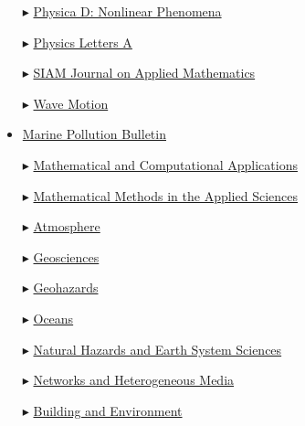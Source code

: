 \begin{itemize}
    \item[$\blacktriangleright$] \href{https://www.sciencedirect.com/journal/physica-d-nonlinear-phenomena/}{Physica D: Nonlinear Phenomena}
    
    \item[$\blacktriangleright$] \href{http://www.journals.elsevier.com/physics-letters-a/}{Physics Letters A}
    
    \item[$\blacktriangleright$] \href{http://www.siam.org/journals/siap.php}{SIAM Journal on Applied Mathematics}
  
    \item[$\blacktriangleright$] \href{http://www.elsevier.com/locate/wavemoti}%
    {Wave Motion}

    \item \href{https://www.sciencedirect.com/journal/marine-pollution-bulletin/}{Marine Pollution Bulletin}
    
    \item[$\blacktriangleright$] \href{https://www.mdpi.com/journal/mca}{Mathematical and Computational Applications}
    
    \item[$\blacktriangleright$] \href{https://onlinelibrary.wiley.com/journal/10991476/}{Mathematical Methods in the Applied Sciences}

    \item[$\blacktriangleright$] \href{https://www.mdpi.com/journal/atmosphere/}{Atmosphere}
    
    \item[$\blacktriangleright$] \href{https://www.mdpi.com/journal/geosciences/}{Geosciences}

    \item[$\blacktriangleright$] \href{https://www.mdpi.com/journal/geohazards/}{Geohazards}

    \item[$\blacktriangleright$] \href{https://www.mdpi.com/journal/oceans/}{Oceans}
    
    \item[$\blacktriangleright$] \href{http://www.nat-hazards-earth-syst-sci.net/}%
    {Natural Hazards and Earth System Sciences}

    \item[$\blacktriangleright$] \href{https://www.aimspress.com/journal/nhm/}{Networks and Heterogeneous Media}

    \item[$\blacktriangleright$] \href{https://www.sciencedirect.com/journal/building-and-environment}%
    {Building and Environment}
    

\end{itemize}
